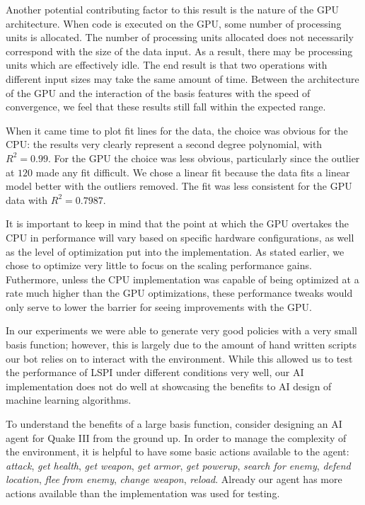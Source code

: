 Another potential contributing factor to this result is the nature of the GPU architecture. When code is executed on the GPU, some number of processing units is allocated. The number of processing units allocated does not necessarily correspond with the size of the data input. As a result, there may be processing units which are effectively idle. The end result is that two operations with different input sizes may take the same amount of time. Between the architecture of the GPU and the interaction of the basis features with the speed of convergence, we feel that these results still fall within the expected range.

When it came time to plot fit lines for the data, the choice was obvious for the CPU: the results very clearly represent a second degree polynomial, with $R^2 = 0.99$. For the GPU the choice was less obvious, particularly since the outlier at $120$ made any fit difficult. We chose a linear fit because the data fits a linear model better with the outliers removed. The fit was less consistent for the GPU data with $R^2 = 0.7987$.

It is important to keep in mind that the point at which the GPU overtakes the CPU in performance will vary based on specific hardware configurations, as well as the level of optimization put into the implementation. As stated earlier, we chose to optimize very little to focus on the scaling performance gains. Futhermore, unless the CPU implementation was capable of being optimized at a rate much higher than the GPU optimizations, these performance tweaks would only serve to lower the barrier for seeing improvements with the GPU.

In our experiments we were able to generate very good policies with a very small basis function; however, this is largely due to the amount of hand written scripts our bot relies on to interact with the environment. While this allowed us to test the performance of LSPI under different conditions very well, our AI implementation does not do well at showcasing the benefits to AI design of machine learning algorithms. 

To understand the benefits of a large basis function, consider designing an AI agent for Quake III from the ground up. In order to manage the complexity of the environment, it is helpful to have some basic actions available to the agent: \emph{attack}, \emph{get health}, \emph{get weapon}, \emph{get armor}, \emph{get powerup}, \emph{search for enemy}, \emph{defend location}, \emph{flee from enemy}, \emph{change weapon}, \emph{reload}. Already our agent has more actions available than the implementation was used for testing.

